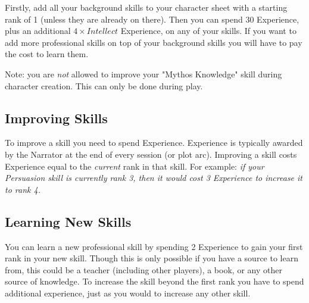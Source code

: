 Firstly, add all your background skills to your character sheet with a starting rank of 1 (unless they are already on there). 
Then you can spend 30 Experience, plus an additional $4 \times Intellect$ Experience, on any of your skills.
If you want to add more professional skills on top of your background skills
you will have to pay the cost to learn them.

Note: you are \textit{not} allowed to improve your "Mythos Knowledge" skill during character creation.
This can only be done during play. 

\subsection{Improving Skills}
To improve a skill you need to spend Experience.
Experience is typically awarded by the Narrator at the end of every session (or plot arc).
Improving a skill costs Experience equal to the \textit{current} rank in that skill.
For example: \textit{if your Persuasion skill is currently rank 3, then it would cost 3 Experience to increase it to rank 4.}

\subsection{Learning New Skills}
You can learn a new professional skill by spending 2 Experience to gain your first rank in your new skill.
Though this is only possible if you have a source to learn from, this could be 
a teacher (including other players), a book, or any other source of knowledge.
To increase the skill beyond the first rank you have to spend additional experience,
just as you would to increase any other skill.





